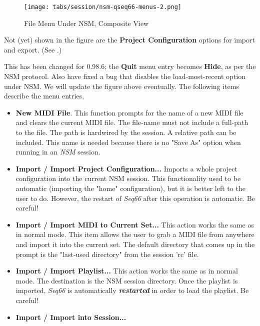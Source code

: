 \begin{figure}[H]
   \centering 
   \texttt{[image: tabs/session/nsm-qseq66-menus-2.png]}
   \caption*{File Menu Under NSM, Composite View}
\end{figure}

   Not (yet) shown in the figure are the \textbf{Project Configuration}
   options for import and export.
   (See .)

   This has been changed for 0.98.6; the \textbf{Quit} menu entry becomes
   \textbf{Hide}, as per the NSM protocol.  Also have fixed a bug that disables
   the load-most-recent option under NSM.
   We will update the figure above eventually.
   The following items describe the menu entries.

   \begin{itemize}
      \item \textbf{New MIDI File}.
         This function prompts for the name of a
         new MIDI file and clears the current MIDI file.  The file-name must not
         include a full-path to the file.  The path is hardwired by the
         session.  A relative path can be included.  This name is needed
         because there is no "Save As" option when running in an \textsl{NSM}
         session.
      \item \textbf{Import / Import Project Configuration...}
         Imports a whole project configuration into the current NSM session.
         This functionality used to be automatic (importing the "home"
         configuration), but it is better left to the user to do.
         However, the restart of \textsl{Seq66} after this operation is
         automatic.  Be careful!
      \item \textbf{Import / Import MIDI to Current Set...}
         This action works the same as in normal mode.
         This item allows the user to grab a MIDI file from anywhere and import
         it into the current set.
         The default directory that comes up in the
         prompt is the "last-used directory" from the session 'rc' file.
      \item \textbf{Import / Import Playlist...}
         This action works the same as in normal mode.
         The destination is the NSM session directory.
         Once the playlist is imported,
         \textsl{Seq66} is automatically \textsl{\textbf{restarted}}
         in order to load the playlist.
         Be careful!
      \item \textbf{Import / Import into Session...}

\end{itemize}
